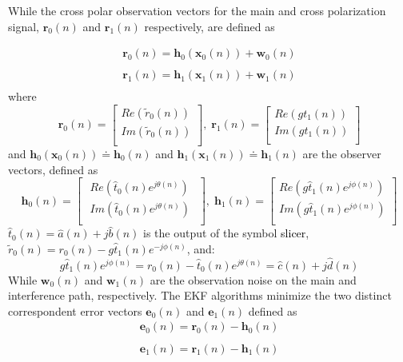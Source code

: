 While the cross polar observation vectors for the main and cross polarization signal, $\mathbf{r}_0(n)$ and $\mathbf{r}_1(n)$ respectively, are defined as

\begin{equation}
\begin{array}{ll}	
\mathbf{r}_0(n)=\mathbf{h}_0(\mathbf{x}_0(n))+\mathbf{w}_0(n)\\
\\
\mathbf{r}_1(n)=\mathbf{h}_1(\mathbf{x}_1(n))+\mathbf{w}_1(n)\\
\label{eq_r1}
\end{array}
\end{equation}
where
	\begin{equation}
	\mathbf{r}_0(n)=\left[\begin{array}{c}
	Re(\tilde{r}_0(n))\\
	Im(\tilde{r}_0(n))\\
	\end{array}\right],\;
	\mathbf{r}_1(n)=\left[\begin{array}{c}
	Re(g t_1(n))\\
	Im(g t_1(n))\\
	\end{array}\right]
	\label{eq_r}
	\end{equation}
	and $\mathbf{h}_0(\mathbf{x}_0(n))\doteq \mathbf{h}_0(n)$ and $\mathbf{h}_1(\mathbf{x}_1(n))\doteq \mathbf{h}_1(n)$ are the observer vectors, defined as
\begin{equation}
\mathbf{h}_0(n)=\left[\begin{array}{c}
\phantom{i}Re(\hat{t}_0(n)e^{j\theta(n)})\phantom{i}\\
\phantom{i}Im(\hat{t}_0(n)e^{j\theta(n)})\phantom{i}\\
\end{array}\right],\;
\mathbf{h}_1(n)=\left[\begin{array}{c}
Re(g\hat{t}_1(n)e^{j\phi(n)})\\
Im(g\hat{t}_1(n)e^{j\phi(n)})\\
\end{array}\right]
\label{eq_r}
\end{equation}
$\hat{t}_0(n)=\hat{a}(n)+j\hat{b}(n)$ is the output of the symbol \textcolor{black}{slicer}, $\tilde{r}_0(n)=r_0(n)-g\hat{t}_1(n)e^{-j\phi(n)}$, and:
\begin{equation}
\label{eq8}
g\hat{t}_1(n)e^{j\phi(n)}=r_0(n)-\hat{t}_0(n)e^{j\theta(n)}=\hat{c}(n)+j\hat{d}(n)
\end{equation}
While $\mathbf{w}_0(n)$ and $\mathbf{w}_1(n)$ are the observation noise on the main and interference path, respectively.
The EKF algorithms minimize the two distinct correspondent error vectors $\mathbf{e}_0(n)$ and $\mathbf{e}_1(n)$ defined as
\begin{equation}
\begin{array}{ll}	
\mathbf{e}_0(n)=\mathbf{r}_0(n)- \mathbf{h}_0(n)\\
\\
\mathbf{e}_1(n)=\mathbf{r}_1(n)- \mathbf{h}_1(n)\\
\label{eq_r2}
\end{array}
\end{equation}

